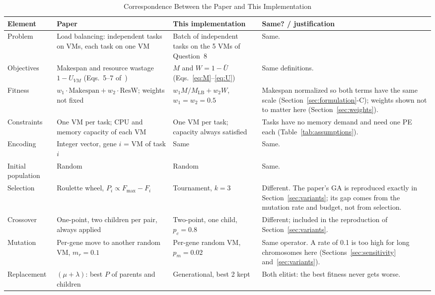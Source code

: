\documentclass[journal,onecolumn,12pt]{IEEEtran}
\newcommand{\MLB}{M_{\mathrm{LB}}}
\newcommand{\Ubar}{\bar{U}}
\begin{document}
\begin{table}[!htbp]
\caption{Correspondence Between the Paper and This Implementation}
\label{tab:corr}
\centering
\small
\begin{threeparttable}
\begin{tabularx}{\textwidth}{@{}>{\raggedright\arraybackslash}p{2.1cm}>{\raggedright\arraybackslash}p{3.6cm}>{\raggedright\arraybackslash}p{3.6cm}>{\raggedright\arraybackslash}X@{}}
\toprule
Element & Paper~\cite{dehury} & This implementation & Same? / justification \\
\midrule
Problem & Load balancing: independent tasks on VMs, each task on one VM & Batch of independent tasks on the 5 VMs of Question~8 & Same. \\
Objectives & Makespan and resource wastage $1-U_{VM}$ (Eqs.~5--7 of~\cite{dehury}) & $M$ and $W=1-\Ubar$ (Eqs.~\ref{eq:M}--\ref{eq:U}) & Same definitions. \\
Fitness & $w_1\cdot\text{Makespan}+w_2\cdot\text{ResW}$; weights not fixed & $w_1M/\MLB+w_2W$, $w_1=w_2=0.5$ & Makespan normalized so both terms have the same scale (Section~\ref{sec:formulation}-C); weights shown not to matter here (Section~\ref{sec:weights}). \\
Constraints & One VM per task; CPU and memory capacity of each VM & One VM per task; capacity always satisfied & Tasks have no memory demand and need one PE each (Table~\ref{tab:assumptions}). \\
Encoding & Integer vector, gene $i$ = VM of task $i$ & Same & Same. \\
Initial population & Random & Random & Same. \\
Selection & Roulette wheel, $P_i\propto F_{\max}-F_i$ & Tournament, $k=3$ & Different. The paper's GA is reproduced exactly in Section~\ref{sec:variants}; its gap comes from the mutation rate and budget, not from selection. \\
Crossover & One-point, two children per pair, always applied & Two-point, one child, $p_c=0.8$ & Different; included in the reproduction of Section~\ref{sec:variants}. \\
Mutation & Per-gene move to another random VM, $m_r=0.1$ & Per-gene random VM, $p_m=0.02$ & Same operator. A rate of 0.1 is too high for long chromosomes here (Sections~\ref{sec:sensitivity} and~\ref{sec:variants}). \\
Replacement & $(\mu+\lambda)$: best $P$ of parents and children & Generational, best 2 kept & Both elitist: the best fitness never gets worse. \\

\end{tabularx}
\end{threeparttable}
\end{table}
\end{document}
